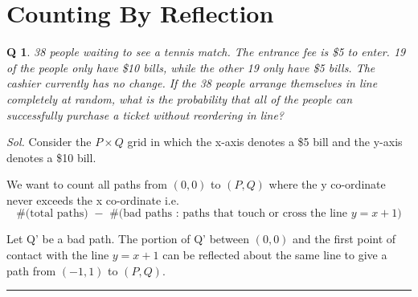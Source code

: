 \documentclass[DIV=15, fleqn, oneside, 8pt]{scrartcl}
\theoremstyle{clean}
\newtheorem{question}{Q} %
\newenvironment{solution}
{\par\textit{Sol.} }     %
{\par\medskip\hrule\bigskip}
\begin{document}
\section*{Counting By Reflection}
\begin{question}
38 people waiting to see a tennis match. The entrance fee is \$5 to enter.
19 of the people only have \$10 bills, 
while the other 19 only have \$5 bills. The cashier currently has no change.
If the 38 people arrange themselves in line completely at random, 
what is the probability that all of the people can successfully purchase a ticket without 
reordering in line?
\end{question}
\begin{solution}
Consider the $P \times Q$ grid in which the x-axis denotes a \$5 bill and the y-axis denotes
a \$10 bill.

We want to count all paths from $(0, 0)$ to $(P, Q)$ where the y co-ordinate never exceeds the
x co-ordinate i.e. 
\begin{equation}
  \text{\#(total paths) $-$ \#(bad paths : paths that touch or cross the line $y = x + 1$)}
\end{equation}

Let Q' be a bad path. The portion of Q' between $(0, 0)$ and the first point of contact
with the line $y = x + 1$ can be reflected about the same line
to give a path from $(-1, 1)$ to $(P, Q)$.

\begin{center}
\end{center}
\end{solution}
\end{document}
